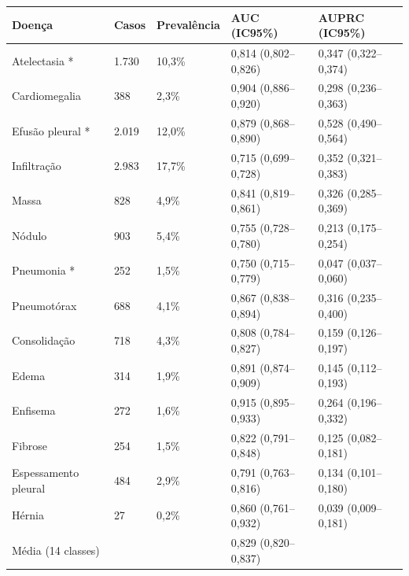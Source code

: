 \begin{tabular}{lllll}
\toprule
Doença & Casos & Prevalência & AUC (IC95\%) & AUPRC (IC95\%) \\
\midrule
Atelectasia * & 1.730 & 10,3\% & 0,814 (0,802–0,826) & 0,347 (0,322–0,374) \\
Cardiomegalia & 388 & 2,3\% & 0,904 (0,886–0,920) & 0,298 (0,236–0,363) \\
Efusão pleural * & 2.019 & 12,0\% & 0,879 (0,868–0,890) & 0,528 (0,490–0,564) \\
Infiltração & 2.983 & 17,7\% & 0,715 (0,699–0,728) & 0,352 (0,321–0,383) \\
Massa & 828 & 4,9\% & 0,841 (0,819–0,861) & 0,326 (0,285–0,369) \\
Nódulo & 903 & 5,4\% & 0,755 (0,728–0,780) & 0,213 (0,175–0,254) \\
Pneumonia * & 252 & 1,5\% & 0,750 (0,715–0,779) & 0,047 (0,037–0,060) \\
Pneumotórax & 688 & 4,1\% & 0,867 (0,838–0,894) & 0,316 (0,235–0,400) \\
Consolidação & 718 & 4,3\% & 0,808 (0,784–0,827) & 0,159 (0,126–0,197) \\
Edema & 314 & 1,9\% & 0,891 (0,874–0,909) & 0,145 (0,112–0,193) \\
Enfisema & 272 & 1,6\% & 0,915 (0,895–0,933) & 0,264 (0,196–0,332) \\
Fibrose & 254 & 1,5\% & 0,822 (0,791–0,848) & 0,125 (0,082–0,181) \\
Espessamento pleural & 484 & 2,9\% & 0,791 (0,763–0,816) & 0,134 (0,101–0,180) \\
Hérnia & 27 & 0,2\% & 0,860 (0,761–0,932) & 0,039 (0,009–0,181) \\
Média (14 classes) &  &  & 0,829 (0,820–0,837) &  \\
\bottomrule
\end{tabular}
